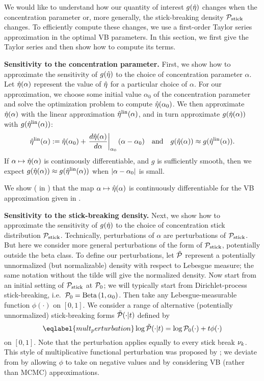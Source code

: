 We would like to understand how our quantity of interest $g(\hat\eta)$ changes
when the concentration parameter or, more generally, the stick-breaking density
$\mathcal{P}_{\mathrm{stick}}$ changes. To efficiently compute these changes, we use a first-order
Taylor series approximation in the optimal VB parameters. In this section, we
first give the Taylor series and then show how to compute its terms.

\noindent \textbf{Sensitivity to the concentration parameter.} First, we show
how to approximate the sensitivity of $g(\hat\eta)$ to the choice of
concentration parameter $\alpha$. Let $\hat\eta(\alpha)$ represent the value of
$\hat\eta$ for a particular choice of $\alpha$. For our approximation, we choose
some initial value $\alpha_0$ of the concentration parameter and solve the
optimization problem to compute $\hat\eta(\alpha_0)$. We then approximate
$\hat\eta(\alpha)$ with the linear approximation $\hat\eta^{\mathrm{lin}}(\alpha)$, and in turn
approximate $g(\hat\eta(\alpha))$ with $g(\hat\eta^{\mathrm{lin}}(\alpha))$:
%
\begin{align*}
%
\etalin(\alpha) :=
    \etaopt(\alpha_0) +
    \fracat{d\etaopt(\alpha)}{d\alpha}{\alpha_0} (\alpha - \alpha_0)
\mathand
g(\etaopt(\alpha)) \approx g(\etalin(\alpha)).
%
\end{align*}
%
If $\alpha \mapsto \hat\eta(\alpha)$ is continuously differentiable, and $g$ is
sufficiently smooth, then we expect $g(\hat\eta(\alpha)) \approx
g(\hat\eta^{\mathrm{lin}}(\alpha))$ when $\left|\alpha - \alpha_0\right|$ is small.

We show ( in ) that the map
$\alpha \mapsto \hat\eta(\alpha)$ is continuously differentiable for the VB
approximation given in .

\noindent \textbf{Sensitivity to the stick-breaking density.} Next, we show how
to approximate the sensitivity of $g(\hat\eta)$ to the choice of concentration
stick distribution $\mathcal{P}_{\mathrm{stick}}$. Technically, perturbations of $\alpha$ are
perturbations of $\mathcal{P}_{\mathrm{stick}}$. But here we consider more general perturbations of
the form of $\mathcal{P}_{\mathrm{stick}}$, potentially outside the beta class. To define our
perturbations, let $\tilde{\mathcal{P}}$ represent a potentially unnormalized (but
normalizable) density with respect to Lebesgue measure; the same notation
without the tilde will give the normalized density. Now start from an initial
setting of $\mathcal{P}_{\mathrm{stick}}$ at $\mathcal{P}_{0}$; we will typically start from Dirichlet-process
stick-breaking, i.e.\ $\mathcal{P}_{0} = \mathrm{Beta}\left(1,\alpha_0\right)$. Then take any
Lebesgue-measurable function $\phi(\cdot)$ on $[0,1]$. We consider a range of
alternative (potentially unnormalized) stick-breaking forms $\tilde{\mathcal{P}}(\cdot \vert
t)$ defined by
%
\begin{equation} \eqlabel{mult_perturbation}
	\log \ptil(\cdot \vert \t) = \log \pbase(\cdot) + \t \phi(\cdot)
\end{equation}
%
on $[0,1]$. Note that the perturbation applies equally to every stick break
$\nu_{k}$. This style of multiplicative functional perturbation was proposed by
\citet{gustafson:1996:local}; we deviate from \citet{gustafson:1996:local} by
allowing $\phi$ to take on negative values and by considering VB (rather than
MCMC) approximations.

